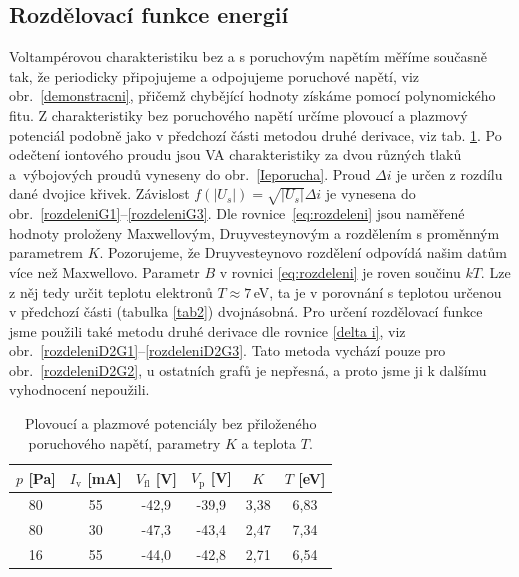 \documentclass[a4paper,12pt]{article}
\begin{document}
\clearpage
\subsection{Rozdělovací funkce energií}
Voltampérovou charakteristiku bez a s poruchovým napětím měříme současně tak, 
že periodicky připojujeme a odpojujeme poruchové napětí, viz 
obr.~\ref{demonstracni}, přičemž chybějící 
hodnoty získáme pomocí polynomického fitu. Z charakteristiky bez 
poruchového napětí určíme plovoucí a plazmový potenciál podobně jako v 
předchozí části metodou druhé derivace, viz tab. \ref{tab3}. Po odečtení 
iontového proudu jsou VA 
charakteristiky za dvou různých tlaků a~výbojových proudů vyneseny do 
obr.~\ref{Ieporucha}. Proud $\Delta i$ je určen z rozdílu dané dvojice 
křivek. 
Závislost $f(\vert U_s\vert) = \sqrt{\vert U_s\vert}\Delta i$ je vynesena do 
obr.~\ref{rozdeleniG1}--\ref{rozdeleniG3}. Dle rovnice~\eqref{eq:rozdeleni} 
jsou naměřené hodnoty proloženy Maxwellovým, Druyvesteynovým a rozdělením s 
proměnným parametrem $K$. 
Pozorujeme, že Druyvesteynovo rozdělení odpovídá našim datům více než 
Maxwellovo. Parametr $B$ v rovnici \eqref{eq:rozdeleni} je roven součinu $kT$. 
Lze z něj tedy určit teplotu elektronů $T\approx7$\,eV, ta je v porovnání s 
teplotou určenou v předchozí části (tabulka \ref{tab2}) dvojnásobná. Pro 
určení rozdělovací funkce jsme použili také metodu druhé derivace dle rovnice 
\eqref{delta i}, viz obr.~\ref{rozdeleniD2G1}--\ref{rozdeleniD2G3}. Tato metoda 
vychází pouze pro obr.~\ref{rozdeleniD2G2}, u ostatních grafů je nepřesná, a 
proto jsme ji k dalšímu vyhodnocení nepoužili.


\begin{center}
	\begin{table}[h!]
		\centering
		\caption{Plovoucí a plazmové potenciály bez přiloženého poruchového 
		napětí, parametry $K$ a teplota $T$.}
		\label{tab3}
		\begin{tabular}{|c|c|c|c|c|c|} \hline
			$p$ [\si{\pascal}] & $I_\text{v}$ [\si{\milli\ampere}] &  
			$V_\text{fl}$ [V] & 
			$V_\text{p}$ [V] & $K$ & $T$ [eV] \\ \hline
			80&55&-42,9&-39,9&3,38&6,83\\ \hline
			80&30&-47,3&-43,4&2,47&7,34\\ \hline
			16&55&-44,0&-42,8&2,71&6,54\\ \hline
			
		\end{tabular}
	\end{table}
\end{center}
\end{document}
